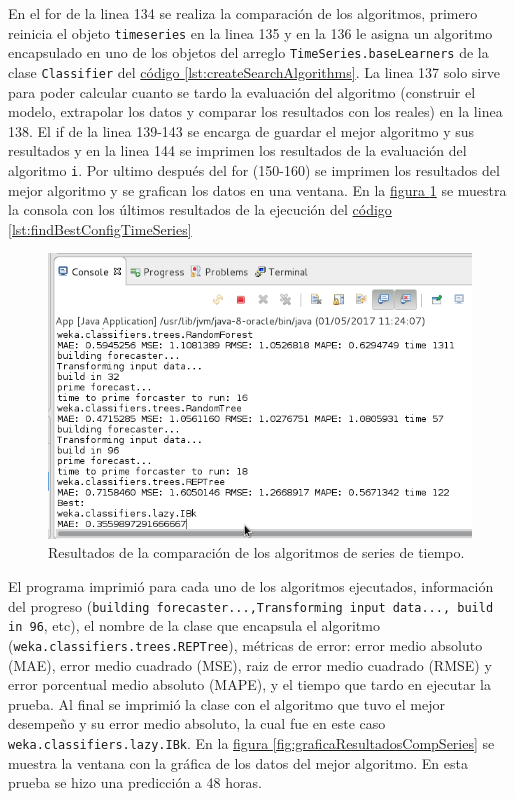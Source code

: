 En el for de la linea 134 se realiza la comparación de los algoritmos, primero reinicia el objeto \texttt{timeseries} en la linea 135 y en la 136 
le asigna un algoritmo encapsulado en uno de los objetos del arreglo \texttt{TimeSeries.baseLearners} de la
clase \texttt{Classifier}
del \hyperref[lst:createSearchAlgorithms]{ código \ref{lst:createSearchAlgorithms}}. La linea 137 solo sirve para poder calcular cuanto se tardo la evaluación del algoritmo (construir el modelo, extrapolar los datos y comparar los resultados con los reales) en la linea 138. El if de la linea 139-143 se encarga de guardar el mejor algoritmo y sus resultados y en la linea 144 se imprimen los resultados de la evaluación del algoritmo \texttt{i}.
Por ultimo después del for (150-160) se imprimen los resultados del mejor algoritmo y se grafican los datos en una ventana. 
En la \hyperref[fig:resultadosCompSeries]{figura \ref{fig:resultadosCompSeries}} se muestra la consola con los últimos resultados de la ejecución del \hyperref[lst:findBestConfigTimeSeries]{ código \ref{lst:findBestConfigTimeSeries}}

\begin{figure}[ht]
	\centering
	\includegraphics[width=15cm]{img/resultadosComparacionSeries.png}
	\caption{Resultados de la comparación de los algoritmos de series de tiempo.}
	\label{fig:resultadosCompSeries}
\end{figure}
El programa imprimió para cada uno de los algoritmos ejecutados, información del progreso (\texttt{building forecaster...,Transforming input data..., build in 96}, etc), el nombre de la clase que encapsula el algoritmo (\texttt{weka.classifiers.trees.REPTree}), métricas de error: error medio absoluto (MAE), error medio cuadrado (MSE), raiz de error medio cuadrado (RMSE) y error porcentual medio absoluto (MAPE), y el tiempo que tardo en ejecutar la prueba. Al final se imprimió la clase con el algoritmo que tuvo el mejor desempeño y su error medio absoluto, la cual fue en este caso \texttt{weka.classifiers.lazy.IBk}.
En la \hyperref[fig:graficaResultadosCompSeries]{figura \ref{fig:graficaResultadosCompSeries}} se muestra la ventana con la gráfica de los datos del mejor algoritmo. En esta prueba se hizo una predicción a 48 horas.

